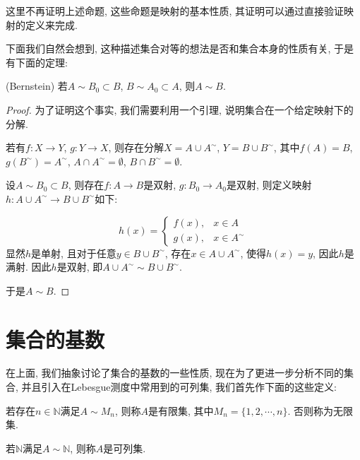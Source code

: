 \documentclass[theorem=false,mathfont=none,openany,sub3section]{easybook}
\begin{document}
\begin{remark}
  这里不再证明上述命题, 这些命题是映射的基本性质, 其证明可以通过直接验证映射的定义来完成.\par
\end{remark}

下面我们自然会想到, 这种描述集合对等的想法是否和集合本身的性质有关, 于是有下面的定理:\par

\begin{theorem}
  (Bernstein) 若$A\sim B_0\subset B$, $B\sim A_0\subset A$, 则$A\sim B$.\par
\end{theorem}

\begin{proof}
  为了证明这个事实, 我们需要利用一个引理, 说明集合在一个给定映射下的分解.\par
  若有$f: X\rightarrow Y$, $g: Y\rightarrow X$, 则存在分解$X=A\cup A^{\sim}$, $Y=B\cup B^{\sim}$, 其中$f(A)= B$, $g(B^{\sim})=A^{\sim}$, $A\cap A^{\sim} = \emptyset$, $B\cap B^{\sim} = \emptyset$.\par
  设$A\sim B_0\subset B$, 则存在$f: A\to B$是双射, $g: B_0\to A_0$是双射, 则定义映射$h: A\cup A^{\sim}\to B\cup B^{\sim}$如下:\par
  \begin{equation*}
    h(x)=
    \begin{cases}
      f(x), & x\in A\\
      g(x), & x\in A^{\sim}
    \end{cases}
  \end{equation*}
  显然$h$是单射, 且对于任意$y\in B\cup B^{\sim}$, 存在$x\in A\cup A^{\sim}$, 使得$h(x)=y$, 因此$h$是满射. 因此$h$是双射, 即$A\cup A^{\sim}\sim B\cup B^{\sim}$.\par
  于是$A\sim B$.\par
\end{proof}

\newpage

\section{集合的基数}

在上面, 我们抽象讨论了集合的基数的一些性质, 现在为了更进一步分析不同的集合, 并且引入在Lebesgue测度中常用到的可列集, 我们首先作下面的这些定义:\par

\begin{definition}
  若存在$n\in \mathbb{N}$满足$A\sim M_{n}$, 则称$A$是有限集, 其中$M_{n}=\{1,2,\cdots,n\}$. 否则称为无限集.\par
  若$\mathbb{N}$满足$A\sim \mathbb{N}$, 则称$A$是可列集.\par
\end{definition}
\end{document}
